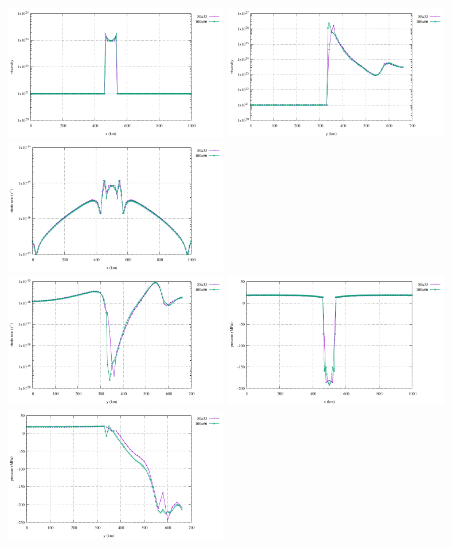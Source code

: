 \begin{center}
\includegraphics[width=5.7cm]{python_codes/fieldstone_87/results/experiment_03/horizontal_profile_eta.pdf}
\includegraphics[width=5.7cm]{python_codes/fieldstone_87/results/experiment_03/vertical_profile_eta.pdf}
\includegraphics[width=5.7cm]{python_codes/fieldstone_87/results/experiment_03/horizontal_profile_srn.pdf}\\
\includegraphics[width=5.7cm]{python_codes/fieldstone_87/results/experiment_03/vertical_profile_srn.pdf}
\includegraphics[width=5.7cm]{python_codes/fieldstone_87/results/experiment_03/horizontal_profile_p.pdf}
\includegraphics[width=5.7cm]{python_codes/fieldstone_87/results/experiment_03/vertical_profile_p.pdf}\\
\end{center}

